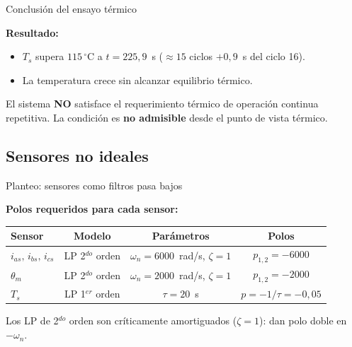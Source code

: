 \documentclass[aspectratio=169,t]{beamer}
\begin{document}
\begin{frame}{Conclusión del ensayo térmico}
\vspace{8mm}

\textbf{Resultado:}
\begin{itemize}
\item $T_s$ supera $115\,^\circ$C a $t = 225{,}9$~s ($\approx 15$ ciclos $+ 0{,}9$~s del ciclo 16).
\item La temperatura crece sin alcanzar equilibrio térmico.
\end{itemize}

\vspace{4mm}
El sistema \textbf{NO} satisface el requerimiento térmico de operación continua repetitiva. La condición es \textbf{no admisible} desde el punto de vista térmico.

\end{frame}


\subsection{Sensores no ideales}

\begin{frame}{Planteo: sensores como filtros pasa bajos}
\vspace{3mm}

\textbf{Polos requeridos para cada sensor:}
\vspace{1mm}

\centering
\footnotesize
\renewcommand{\arraystretch}{1.2}
\begin{tabular}{|l|c|c|c|}
\hline
\textbf{Sensor} & \textbf{Modelo} & \textbf{Parámetros} & \textbf{Polos} \\
\hline
$i_{as},\,i_{bs},\,i_{cs}$ & LP 2$^{do}$ orden & $\omega_n = 6000$~rad/s, $\zeta = 1$ & $p_{1,2} = -6000$ \\
$\theta_m$ & LP 2$^{do}$ orden & $\omega_n = 2000$~rad/s, $\zeta = 1$ & $p_{1,2} = -2000$ \\
$T_s$ & LP 1$^{er}$ orden & $\tau = 20$~s & $p = -1/\tau = -0{,}05$ \\
\hline
\end{tabular}
\normalsize

\vspace{4mm}
{\small Los LP de 2$^{do}$ orden son críticamente amortiguados ($\zeta=1$): dan polo doble en $-\omega_n$.}
\end{frame}
\end{document}
